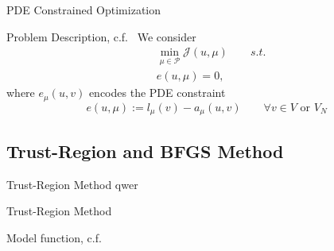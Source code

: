 \begin{frame}{PDE Constrained Optimization}
    \begin{block}{Problem Description, c.f.~\cite{Hinze2009}}
        We consider
        \begin{align*}
            &\min\limits_{\mu \in \mathcal{P}} \mathcal{J}(u, \mu) \qquad s.t.\\
            &e(u, \mu) = 0,
        \end{align*}
        where $e_\mu(u, v)$ encodes the PDE constraint
        \begin{equation*}
            e(u, \mu) := l_\mu(v) - a_\mu(u, v) \qquad \forall v \in V \text{ or } V_N
        \end{equation*}
    \end{block}
\end{frame}

\subsection{Trust-Region and BFGS Method}

\begin{frame}{Trust-Region Method}
    qwer
\end{frame}

\begin{frame}{Trust-Region Method}
    \begin{block}{Model function, c.f.~\cite{Kelley1999}}
    \end{block}
\end{frame}

